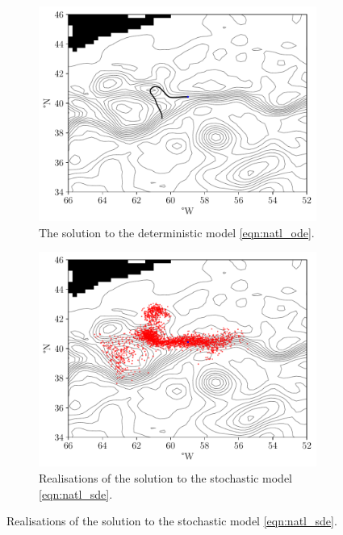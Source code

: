 \begin{figure}
	\begin{center}
		\begin{subfigure}[t]{0.7\textwidth}
			\includegraphics[width=\textwidth]{chp06_applications/figures/gulf_stream/det_traj.pdf}
			\caption{The solution to the deterministic model \cref{eqn:natl_ode}.}
			\label{fig:natl_det_traj}
		\end{subfigure}
		\begin{subfigure}[t]{0.7\textwidth}
			\includegraphics[width=\textwidth]{chp06_applications/figures/gulf_stream/traj_stoch_rels}
			\caption{Realisations of the solution to the stochastic model \cref{eqn:natl_sde}.}

\end{subfigure}
\end{center}
\end{figure}
